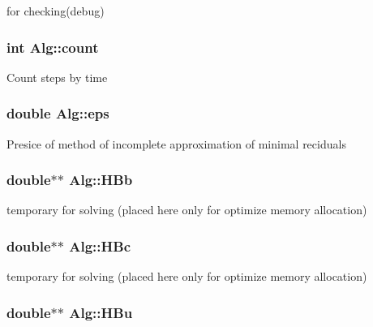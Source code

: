 \label{classAlg_a595d62a49951a021c9cc071f0079a21a}
for checking(debug) \hypertarget{classAlg_a919db7af2565185ba66adc8c0ae54686}{
\subsubsection[{count}]{\setlength{\rightskip}{0pt plus 5cm}int {\bf Alg::count}}}
\label{classAlg_a919db7af2565185ba66adc8c0ae54686}
Count steps by time \hypertarget{classAlg_aacfa2077c54f2971b335927ef4e952c8}{
\subsubsection[{eps}]{\setlength{\rightskip}{0pt plus 5cm}double {\bf Alg::eps}}}
\label{classAlg_aacfa2077c54f2971b335927ef4e952c8}
Presice of method of incomplete approximation of minimal reciduals \hypertarget{classAlg_a151c5a0de6551e528f886addad8cf9f3}{
\subsubsection[{HBb}]{\setlength{\rightskip}{0pt plus 5cm}double$\ast$$\ast$ {\bf Alg::HBb}}}
\label{classAlg_a151c5a0de6551e528f886addad8cf9f3}
temporary for solving (placed here only for optimize memory allocation) \hypertarget{classAlg_a68d9a231e894287711a457005962e835}{
\subsubsection[{HBc}]{\setlength{\rightskip}{0pt plus 5cm}double$\ast$$\ast$ {\bf Alg::HBc}}}
\label{classAlg_a68d9a231e894287711a457005962e835}
temporary for solving (placed here only for optimize memory allocation) \hypertarget{classAlg_ad2f2df479bdee0b098e959eb6750ad24}{
\subsubsection[{HBu}]{\setlength{\rightskip}{0pt plus 5cm}double$\ast$$\ast$ {\bf Alg::HBu}}}
